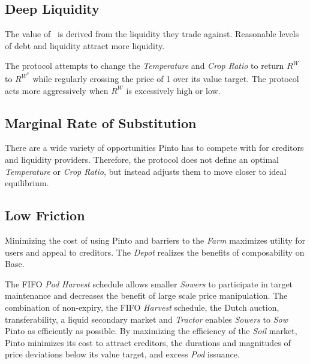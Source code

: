 \documentclass[tikz]{article}
\newcommand{\term}[1]{\textsl{#1}}
\newcommand{\Pinto}{} %
\renewcommand{\Pinto}{\usebox{\cachePinto}}
\begin{document}

\vspace{0.1cm}
\subsection{Deep Liquidity}
\vspace{0.1cm}

The value of \Pinto\ is derived from the liquidity they trade against. Reasonable levels of debt and liquidity attract more liquidity. 

\vspace{0.1cm}

The protocol attempts to change the \term{Temperature} and \term{Crop Ratio} to return $R^{W}$ to $R^{W^{*}}$ while regularly crossing the price of \Pinto1 over its value target. The protocol acts more aggressively when $R^{W}$ is excessively high or low.


\subsection{Marginal Rate of Substitution}

There are a wide variety of opportunities Pinto has to compete with for creditors and liquidity providers. Therefore, the protocol does not define an optimal \term{Temperature} or \term{Crop Ratio}, but instead adjusts them to move closer to ideal equilibrium. 


\subsection{Low Friction}

Minimizing the cost of using Pinto and barriers to the \term{Farm} maximizes utility for users and appeal to creditors. The \term{Depot} realizes the benefits of composability on Base.

The FIFO \term{Pod} \term{Harvest} schedule allows smaller \term{Sowers} to participate in target maintenance and decreases the benefit of large scale price manipulation. The combination of non-expiry, the FIFO \term{Harvest} schedule, the Dutch auction, transferability, a liquid secondary market and \term{Tractor} enables \term{Sowers} to \term{Sow} Pinto as efficiently as possible. By maximizing the efficiency of the \term{Soil} market, Pinto minimizes its cost to attract creditors, the durations and magnitudes of price deviations below its value target, and excess \term{Pod} issuance.
\end{document}
